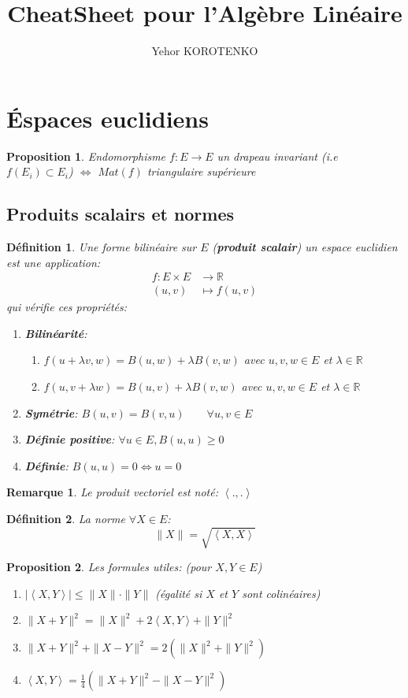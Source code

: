 \documentclass[a4paper]{article}
\author{Yehor KOROTENKO}
\title{CheatSheet pour l'Algèbre Linéaire}
\newcommand{\R}{\mathbb{R}}
\newcommand{\scalair}[1]{\left\langle #1 \right\rangle}
\newtheorem{definition}{Définition}[section]
\newtheorem{prop}{Proposition}[section]
\newtheorem*{remark}{Remarque}
\begin{document}
\maketitle
\section{Éspaces euclidiens}
   \begin{prop}
      Endomorphisme $f: E \to E$ un drapeau invariant (i.e $f(E_i) \subset E_i$) $\iff$ $Mat(f)$ triangulaire supérieure 
   \end{prop} 
\subsection{Produits scalairs et normes}
\begin{definition}
    Une forme bilinéaire sur $E$ (\textbf{produit scalair}) un espace euclidien est une application:
    \begin{align*}
        f: E \times E &\longrightarrow \R \\
        (u, v) &\longmapsto f(u, v) 
    \end{align*}
    qui vérifie ces propriétés:
    \begin{enumerate}
        \item \textbf{Bilinéarité}:
            \begin{enumerate}
                \item $f(u + \lambda v, w) = B(u, w) + \lambda B(v, w)$ avec $u, v, w \in E$ et  $\lambda \in \R$
                \item $f(u, v + \lambda w) = B(u, v) + \lambda B(v, w)$ avec $u, v, w \in E$ et $\lambda \in \R$
            \end{enumerate}
        \item \textbf{Symétrie}: $B(u, v) = B(v, u) \qquad \forall u, v \in E$ 
        \item \textbf{Définie positive}: $\forall u \in E, B(u, u) \ge 0$
        \item \textbf{Définie}: $B(u, u) = 0 \iff u = 0$
    \end{enumerate}
\end{definition}
\begin{remark}
    Le produit vectoriel est noté: $\scalair{., .}$ 
\end{remark}
\begin{definition}
    La norme $\forall X \in E$:
    \[
        \|X\| = \sqrt{\scalair{X, X}} 
    \] 
\end{definition}
\begin{prop}
   Les formules utiles: (pour $X, Y \in E$)
   \begin{enumerate}
       \item $|\scalair{X, Y}| \le \|X\| \cdot \|Y\|$ (égalité si $X$ et  $Y$ sont colinéaires)
       \item $\|X + Y\|^2 = \|X\|^2 + 2\scalair{X, Y} + \|Y\|^2$ 
       \item $\|X + Y\|^2 + \|X - Y\|^2 = 2\left( \|X\|^2 + \|Y\|^2 \right) $
       \item $\scalair{X, Y} = \frac{1}{4}\left( \|X + Y\|^2 - \|X - Y\|^2 \right) $
   \end{enumerate}
\end{prop}
\end{document}
